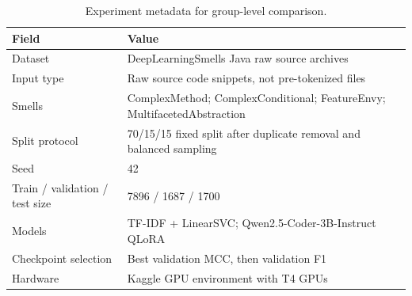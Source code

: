 \begin{table}[H]
\centering
\small
\begin{tabular}{@{}lP{0.62\textwidth}@{}}
\toprule
Field & Value \\
\midrule
Dataset & DeepLearningSmells Java raw source archives \\
Input type & Raw source code snippets, not pre-tokenized files \\
Smells & ComplexMethod; ComplexConditional; FeatureEnvy; MultifacetedAbstraction \\
Split protocol & 70/15/15 fixed split after duplicate removal and balanced sampling \\
Seed & 42 \\
Train / validation / test size & 7896 / 1687 / 1700 \\
Models & TF-IDF + LinearSVC; Qwen2.5-Coder-3B-Instruct QLoRA \\
Checkpoint selection & Best validation MCC, then validation F1 \\
Hardware & Kaggle GPU environment with T4 GPUs \\
\bottomrule
\end{tabular}
\caption{Experiment metadata for group-level comparison.}
\label{tab:experiment-metadata}
\end{table}
